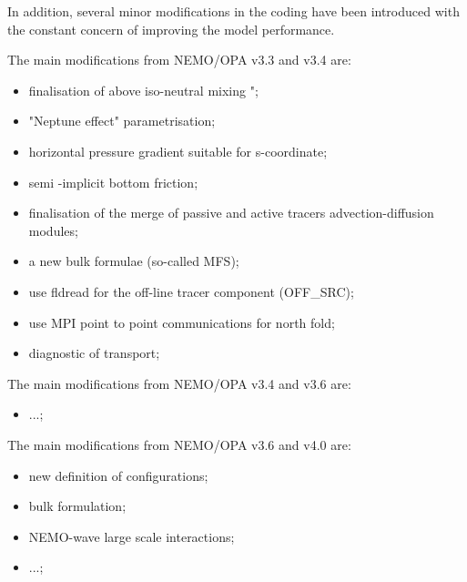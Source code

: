 \documentclass[../main/NEMO_manual]{subfiles}
\begin{document}
In addition, several minor modifications in the coding have been introduced with the constant concern of
improving the model performance.

The main modifications from NEMO/OPA v3.3 and v3.4 are:

\begin{itemize}
\item finalisation of above iso-neutral mixing \citep{griffies.gnanadesikan.ea_JPO98}";
\item "Neptune effect" parametrisation;
\item horizontal pressure gradient suitable for s-coordinate;
\item semi -implicit bottom friction;
\item finalisation of the merge of passive and active tracers advection-diffusion modules;
\item a new bulk formulae (so-called MFS);
\item use fldread for the off-line tracer component (OFF\_SRC);
\item use MPI point to point communications for north fold;
\item diagnostic of transport;
\end{itemize}

The main modifications from NEMO/OPA v3.4 and v3.6 are:

\begin{itemize}
 \item ...;
\end{itemize}

The main modifications from NEMO/OPA v3.6 and v4.0 are:

\begin{itemize}
\item new definition of configurations;
\item bulk formulation;
\item NEMO-wave large scale interactions;
\item ...;
\end{itemize}

\biblio

\pindex
\end{document}
